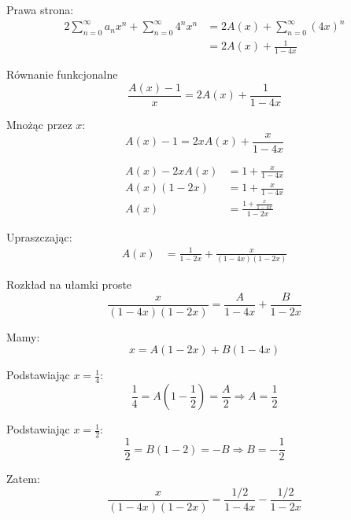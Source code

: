 \documentclass{mwart}
\begin{document}
\begin{mdframed}
    Prawa strona:
    \begin{align}
    2\sum_{n=0}^{\infty} a_n x^n + \sum_{n=0}^{\infty} 4^n x^n &= 2A(x) + \sum_{n=0}^{\infty} (4x)^n \\
    &= 2A(x) + \frac{1}{1-4x}
    \end{align}
        
    Równanie funkcjonalne
    \begin{equation}
    \frac{A(x) - 1}{x} = 2A(x) + \frac{1}{1-4x}
    \end{equation}
        
    Mnożąc przez $x$:
    \begin{equation}
    A(x) - 1 = 2xA(x) + \frac{x}{1-4x}
    \end{equation}
        
    \begin{align}
    A(x) - 2xA(x) &= 1 + \frac{x}{1-4x} \\
    A(x)(1 - 2x) &= 1 + \frac{x}{1-4x} \\
    A(x) &= \frac{1 + \frac{x}{1-4x}}{1-2x}
    \end{align}
        
    Upraszczając:
    \begin{align}
    A(x) &= \frac{1}{1-2x} + \frac{x}{(1-4x)(1-2x)}
    \end{align}
        
    Rozkład na ułamki proste
    \begin{equation}
    \frac{x}{(1-4x)(1-2x)} = \frac{A}{1-4x} + \frac{B}{1-2x}
    \end{equation}
        
    Mamy:
    \begin{equation}
    x = A(1-2x) + B(1-4x)
    \end{equation}
        
    Podstawiając $x = \frac{1}{4}$:
    \begin{equation}
    \frac{1}{4} = A\left(1-\frac{1}{2}\right) = \frac{A}{2} \Rightarrow A = \frac{1}{2}
    \end{equation}
        
    Podstawiając $x = \frac{1}{2}$:
    \begin{equation}
    \frac{1}{2} = B(1-2) = -B \Rightarrow B = -\frac{1}{2}
    \end{equation}
        
    Zatem:
    \begin{equation}
    \frac{x}{(1-4x)(1-2x)} = \frac{1/2}{1-4x} - \frac{1/2}{1-2x}
    \end{equation}
        

\end{mdframed}
\end{document}
